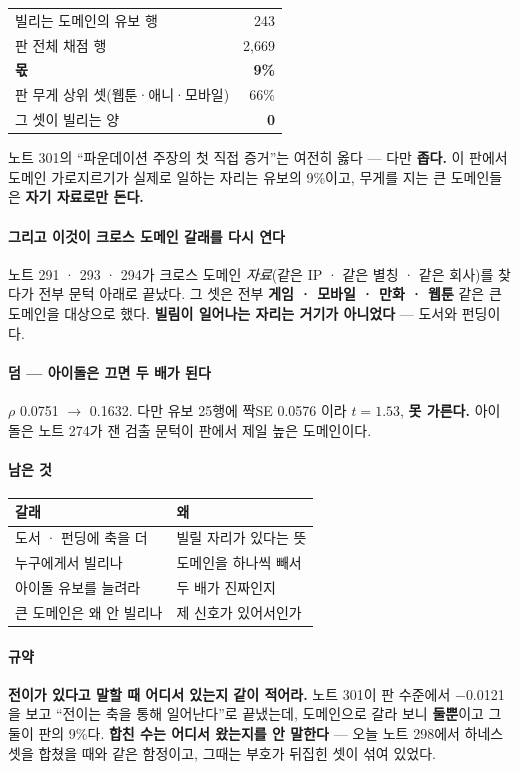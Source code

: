\documentclass[10pt]{article}
\begin{document}
\begin{center}\footnotesize
\begin{tabular}{lr}
\hline
빌리는 도메인의 유보 행 & 243 \\
판 전체 채점 행 & 2,669 \\
\hline
\textbf{몫} & \textbf{9\%} \\
\hline
판 무게 상위 셋(웹툰·애니·모바일) & 66\% \\
그 셋이 빌리는 양 & \textbf{0} \\
\hline
\end{tabular}
\end{center}

노트 301의 ``파운데이션 주장의 첫 직접 증거''는 여전히 옳다 --- 다만
\textbf{좁다.} 이 판에서 도메인 가로지르기가 실제로 일하는 자리는 유보의
9\%이고, 무게를 지는 큰 도메인들은 \textbf{자기 자료로만 돈다.}

\paragraph{그리고 이것이 크로스 도메인 갈래를 다시 연다} 노트 291 · 293 ·
294가 크로스 도메인 \emph{자료}(같은 IP · 같은 별칭 · 같은 회사)를 찾다가
전부 문턱 아래로 끝났다. 그 셋은 전부 \textbf{게임 · 모바일 · 만화 · 웹툰}
같은 큰 도메인을 대상으로 했다. \textbf{빌림이 일어나는 자리는 거기가
아니었다} --- 도서와 펀딩이다.

\paragraph{덤 --- 아이돌은 끄면 두 배가 된다} $\rho$ 0.0751 $\to$ 0.1632.
다만 유보 25행에 짝SE 0.0576 이라 $t{=}1.53$, \textbf{못 가른다.}
아이돌은 노트 274가 잰 검출 문턱이 판에서 제일 높은 도메인이다.

\paragraph{남은 것}
\begin{center}\small
\begin{tabular}{ll}
\hline
갈래 & 왜 \\
\hline
도서 · 펀딩에 축을 더 & 빌릴 자리가 있다는 뜻 \\
누구에게서 빌리나 & 도메인을 하나씩 빼서 \\
아이돌 유보를 늘려라 & 두 배가 진짜인지 \\
큰 도메인은 왜 안 빌리나 & 제 신호가 있어서인가 \\
\hline
\end{tabular}
\end{center}

\paragraph{규약} \textbf{전이가 있다고 말할 때 어디서 있는지 같이 적어라.}
노트 301이 판 수준에서 $-$0.0121 을 보고 ``전이는 축을 통해 일어난다''로
끝냈는데, 도메인으로 갈라 보니 \textbf{둘뿐}이고 그 둘이 판의 9\%다.
\textbf{합친 수는 어디서 왔는지를 안 말한다} --- 오늘 노트 298에서 하네스
셋을 합쳤을 때와 같은 함정이고, 그때는 부호가 뒤집힌 셋이 섞여 있었다.
\end{document}

